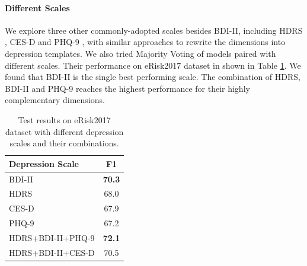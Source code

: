 \paragraph{Different Scales}
We explore three other commonly-adopted scales besides BDI-II, including HDRS \citep{hamilton1986hamilton}, CES-D \citep{Lenore1977CES-D} and PHQ-9 \citep{kroenke2001phq}, with similar approaches to rewrite the dimensions into depression templates. We also tried Majority Voting of models paired with different scales. Their performance on eRisk2017 dataset in shown in Table \ref{tab:scales}. We found that BDI-II is the single best performing scale. The combination of HDRS, BDI-II and PHQ-9 reaches the highest performance for their highly complementary dimensions. 

\begin{table}[h]
    \centering
	\small
    \begin{tabular}{l|c}
        \hline
        Depression Scale & F1 \\
        \hline
        BDI-II & \textbf{70.3} \\
        HDRS & 68.0 \\
        CES-D & 67.9 \\
        PHQ-9 & 67.2\\
        \hline
        HDRS+BDI-II+PHQ-9 & \textbf{72.1} \\
        HDRS+BDI-II+CES-D & 70.5 \\
        \hline
    \end{tabular}
    \caption{Test results on eRisk2017 dataset with different depression scales and their combinations.}
    \label{tab:scales}
\end{table}
